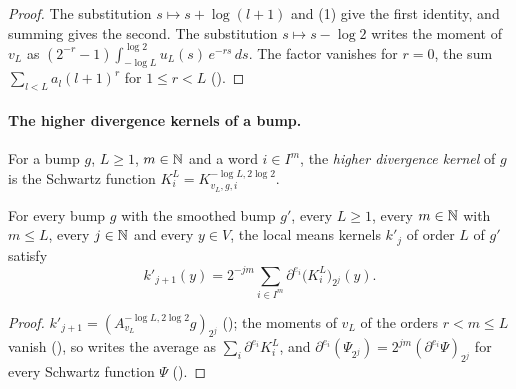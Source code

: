 \begin{proof}
\leanok
The substitution $s \mapsto s + \log(l + 1)$ and  (1) give
the first identity, and summing gives the second. The substitution $s \mapsto s - \log 2$ writes
the moment of $v_L$ as $(2^{-r} - 1) \int_{-\log L}^{\log 2} u_L(s) \, e^{-rs} \, ds$. The factor
vanishes for $r = 0$, the sum $\sum_{l < L} a_l (l + 1)^r$ for $1 \leq r < L$
().
\end{proof}

\paragraph{The higher divergence kernels of a bump.}

\begin{definition}
\label{def:bump-higher-kernels}
\leanok
{}
For a bump $g$, $L \geq 1$, $m \in \mathbb{N}$ and a word $i \in I^m$, the \emph{higher divergence kernel}
of $g$
is the Schwartz function $K^L_i = K^{-\log L, 2 \log 2}_{v_L, g, i}$.
\end{definition}

\begin{theorem}
\label{thm:bump-higher-identity}
\leanok
{}
For every bump $g$ with the smoothed bump $g'$, every $L \geq 1$, every $m \in \mathbb{N}$ with $m \leq L$,
every
$j \in \mathbb{N}$ and every $y \in V$, the local means kernels $k'_j$ of order $L$ of $g'$ satisfy
\[
  k'_{j+1}(y) = 2^{-jm} \sum_{i \in I^m} \partial^{e_i} \bigl(K^L_i\bigr)_{2^j}(y) .
\]
\end{theorem}

\begin{proof}
\leanok
$k'_{j+1} = (A^{-\log L, 2 \log 2}_{v_L} g)_{2^j}$ (); the moments
of $v_L$ of the orders $r < m \leq L$ vanish (), so
 writes the average as $\sum_i \partial^{e_i} K^L_i$, and
$\partial^{e_i} (\Psi_{2^j}) = 2^{jm} (\partial^{e_i} \Psi)_{2^j}$ for every Schwartz function
$\Psi$ ().
\end{proof}

